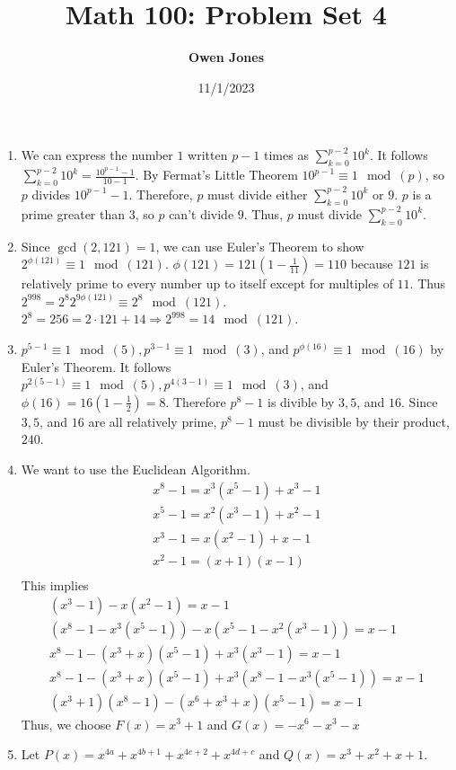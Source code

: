 \documentclass[10pt]{article}
\title{\bf Math 100: Problem Set 4}
\date{11/1/2023}
\author{\bf Owen Jones}
\begin{document}
\maketitle
\begin{enumerate}[label= (Q-\arabic*)]
\item We can express the number $1$ written $p-1$ times as $\displaystyle \sum_{k=0}^{p-2}10^k$. 
It follows $\displaystyle \sum_{k=0}^{p-2}10^k=\frac{10^{p-1}-1}{10-1}$. 
By Fermat's Little Theorem $10^{p-1}\equiv1\mod(p)$, so $p$ divides $10^{p-1}-1$.
Therefore, $p$ must divide either $\displaystyle \sum_{k=0}^{p-2}10^k$ or $9$. 
$p$ is a prime greater than $3$, so $p$ can't divide $9$. Thus, $p$ must divide $\displaystyle \sum_{k=0}^{p-2}10^k$.
\item Since $\gcd(2,121)=1$, we can use Euler's Theorem to show $2^{\phi(121)}\equiv1\mod(121)$. 
$\phi(121)=121(1-\frac{1}{11})=110$ because $121$ is relatively prime to every number up to itself except for multiples of $11$.
Thus $2^{998}=2^{8}2^{9\phi(121)}\equiv 2^{8}\mod (121)$. $2^8=256=2\cdot121+14\Rightarrow2^{998}=14\mod(121)$.
\item $p^{5-1}\equiv1\mod(5),p^{3-1}\equiv1\mod(3)$, and $p^{\phi(16)}\equiv1\mod(16)$ by Euler's Theorem. 
It follows $p^{2(5-1)}\equiv1\mod(5),p^{4(3-1)}\equiv1\mod(3)$, and $\phi(16)=16(1-\frac{1}{2})=8$.
Therefore $p^8-1$ is divible by $3,5$, and $16$. Since $3,5$, and $16$ are all relatively prime, $p^8-1$ must be divisible by their product, $240$.
\item We want to use the Euclidean Algorithm. 
\begin{align*}
    x^8-1=x^3(x^5-1)+x^3-1\\
    x^5-1=x^2(x^3-1)+x^2-1\\
    x^3-1=x(x^2-1)+x-1\\
    x^2-1=(x+1)(x-1)\\
\end{align*}
This implies
\begin{align*}
    (x^3-1)-x(x^2-1)=x-1\\
    (x^8-1-x^3(x^5-1))-x(x^5-1-x^2(x^3-1))=x-1\\
    x^8-1-(x^3+x)(x^5-1)+x^3(x^3-1)=x-1\\
    x^8-1-(x^3+x)(x^5-1)+x^3(x^8-1-x^3(x^5-1))=x-1\\
    (x^3+1)(x^8-1)-(x^6+x^3+x)(x^5-1)=x-1
\end{align*}
Thus, we choose $F(x)=x^3+1$ and $G(x)=-x^6-x^3-x$
\item Let $P(x)=x^{4a}+x^{4b+1}+x^{4c+2}+x^{4d+c}$ and $Q(x)=x^3+x^2+x+1$. 

\end{enumerate}
\end{document}
